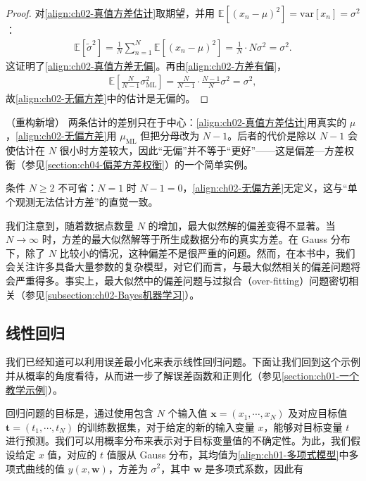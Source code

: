 \documentclass[../../main.tex]{subfiles}
\begin{document}
\begin{proof}
对\eqref{align:ch02-真值方差估计}取期望，并用 $\mathbb{E}[(x_n-\mu)^{2}]=\mathrm{var}[x_n]=\sigma^{2}$：
\begin{align*}
  \mathbb{E}\left[\tilde{\sigma}^{2}\right] = \frac{1}{N}\sum_{n=1}^{N}\mathbb{E}\left[(x_n-\mu)^{2}\right] = \frac{1}{N}\cdot N\sigma^{2} = \sigma^{2} .
\end{align*}
这证明了\eqref{align:ch02-真值方差无偏}。再由\eqref{align:ch02-方差有偏}，
\begin{align*}
  \mathbb{E}\left[\frac{N}{N-1}\sigma_{\mathrm{ML}}^{2}\right] = \frac{N}{N-1}\cdot\frac{N-1}{N}\sigma^{2} = \sigma^{2},
\end{align*}
故\eqref{align:ch02-无偏方差}中的估计是无偏的。
\end{proof}

\begin{remark}（重构新增）
两条估计的差别只在于中心：\eqref{align:ch02-真值方差估计}用真实的 $\mu$，\eqref{align:ch02-无偏方差}用 $\mu_{\mathrm{ML}}$ 但把分母改为 $N-1$。后者的代价是除以 $N-1$ 会使估计在 $N$ 很小时方差较大，因此“无偏”并不等于“更好”——这是偏差—方差权衡（参见\cref{section:ch04-偏差方差权衡}）的一个简单实例。

条件 $N\geqslant2$ 不可省：$N=1$ 时 $N-1=0$，\eqref{align:ch02-无偏方差}无定义，这与“单个观测无法估计方差”的直觉一致。
\end{remark}

我们注意到，随着数据点数量 $N$ 的增加，最大似然解的偏差变得不显著。当 $N\to\infty$ 时，方差的最大似然解等于所生成数据分布的真实方差。在 Gauss 分布下，除了 $N$ 比较小的情况，这种偏差不是很严重的问题。然而，在本书中，我们会关注许多具备大量参数的复杂模型，对它们而言，与最大似然相关的偏差问题将会严重得多。事实上，最大似然中的偏差问题与过拟合（over-fitting）问题密切相关（参见\cref{subsection:ch02-Bayes机器学习}）。

\subsection{线性回归}\label{subsection:ch02-线性回归}

我们已经知道可以利用误差最小化来表示线性回归问题。下面让我们回到这个示例并从概率的角度看待，从而进一步了解误差函数和正则化（参见\cref{section:ch01-一个教学示例}）。

回归问题的目标是，通过使用包含 $N$ 个输入值 $\mathbf{x}=(x_1,\cdots,x_N)$ 及对应目标值 $\mathbf{t}=(t_1,\cdots,t_N)$ 的训练数据集，对于给定的新的输入变量 $x$，能够对目标变量 $t$ 进行预测。我们可以用概率分布来表示对于目标变量值的不确定性。为此，我们假设给定 $x$ 值，对应的 $t$ 值服从 Gauss 分布，其均值为\eqref{align:ch01-多项式模型}中多项式曲线的值 $y(x,\mathbf{w})$，方差为 $\sigma^{2}$，其中 $\mathbf{w}$ 是多项式系数，因此有
\end{document}
